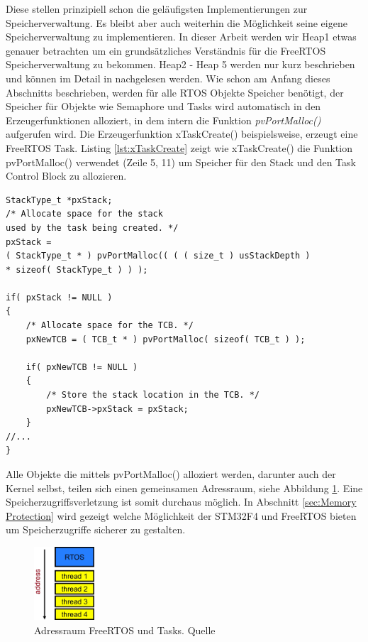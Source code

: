    
Diese stellen prinzipiell schon die ge\-läu\-figsten Implementierungen zur Speicherverwaltung. Es bleibt aber auch weiterhin die Möglichkeit seine eigene Speicherverwaltung zu implementieren. In dieser Arbeit werden wir Heap1 etwas genauer betrachten um ein grund\-sätz\-liches Verständnis für die FreeRTOS Speicherverwaltung zu bekommen. Heap2 - Heap 5 werden nur kurz beschrieben und können im Detail in \cite{MasteringFreeRtos}\cite{FreeRtosAdvanced} nachgelesen werden.      
Wie schon am Anfang dieses Abschnitts beschrieben, werden für alle RTOS Objekte Speicher benötigt, der Speicher für Objekte wie Semaphore und Tasks wird automatisch in den Erzeugerfunktionen alloziert, in dem intern die Funktion \textit{pvPortMalloc()} aufgerufen wird. Die Erzeugerfunktion xTaskCreate() beispielsweise, erzeugt eine FreeRTOS Task. Listing \ref{lst:xTaskCreate} zeigt wie xTaskCreate() die Funktion pvPortMalloc() verwendet (Zeile 5, 11) um Speicher für den Stack und den Task Control Block zu allozieren.
\begin{lstlisting}[caption={xTaskCreate() memory allocation. Aus Task.c}, linewidth=8cm,captionpos=b, label=lst:xTaskCreate, float=hbt]
StackType_t *pxStack;
/* Allocate space for the stack 
used by the task being created. */
pxStack = 
( StackType_t * ) pvPortMalloc(( ( ( size_t ) usStackDepth ) 
* sizeof( StackType_t ) ) );

if( pxStack != NULL )
{
	/* Allocate space for the TCB. */
	pxNewTCB = ( TCB_t * ) pvPortMalloc( sizeof( TCB_t ) );

	if( pxNewTCB != NULL )
	{
		/* Store the stack location in the TCB. */
		pxNewTCB->pxStack = pxStack;
	}
//...
}
\end{lstlisting}
Alle Objekte die mittels pvPortMalloc() alloziert werden, darunter auch der Kernel selbst, teilen sich einen gemeinsamen Adressraum, siehe Abbildung \ref{fig:AddressSpace}. Eine Speicherzugriffsverletzung ist somit durchaus möglich. In Abschnitt \ref{sec:Memory Protection} wird gezeigt welche Möglichkeit der STM32F4 und FreeRTOS bieten um Speicherzugriffe sicherer zu gestalten.    
\begin{figure}[htb!]
	\centering
		\includegraphics[width=0.2\textwidth]{Pictures/EmbeddedCom/addressSpace.jpg}
	\caption{Adressraum FreeRTOS und Tasks. Quelle~\protect{}}
	\label{fig:AddressSpace}
\end{figure}    
